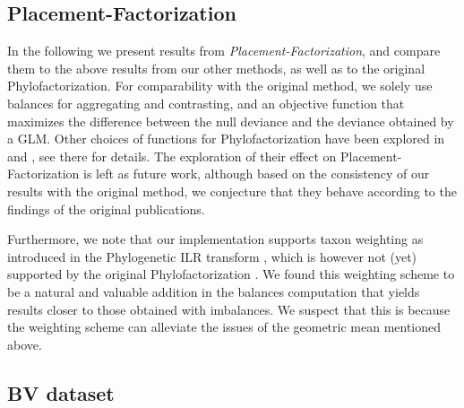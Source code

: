 \subsection{Placement-Factorization}
\label{ch:Factorization:sec:Evaluation:sub:Phylofactor}

In the following we present results from \emph{Placement-Factorization}, %
and compare them to the above results from our other methods, as well as to the original Phylofactorization.
For comparability with the original method, we solely use balances for aggregating and contrasting,
and an objective function that maximizes the difference between the null deviance and the deviance obtained by a \acf{GLM}.
Other choices of functions for Phylofactorization have been explored in \cite{Washburne2017a} and \cite{Washburne2019},
see there for details.
The exploration of their effect on Placement-Factorization is left as future work,
although based on the consistency of our results with the original method,
we conjecture that they behave according to the findings of the original publications.

Furthermore, we note that our implementation supports taxon weighting
as introduced in the Phylogenetic ILR transform \cite{Silverman2017},
which is however not (yet) supported by the original Phylofactorization \cite{Washburne2017a}.
We found this weighting scheme to be a natural and valuable addition in the balances computation
that yields results closer to those obtained with imbalances.
We suspect that this is because the weighting scheme can alleviate the issues of the geometric mean mentioned above.



\subsection{BV dataset}
\label{ch:Factorization:sec:Evaluation:sub:BVDataset}

